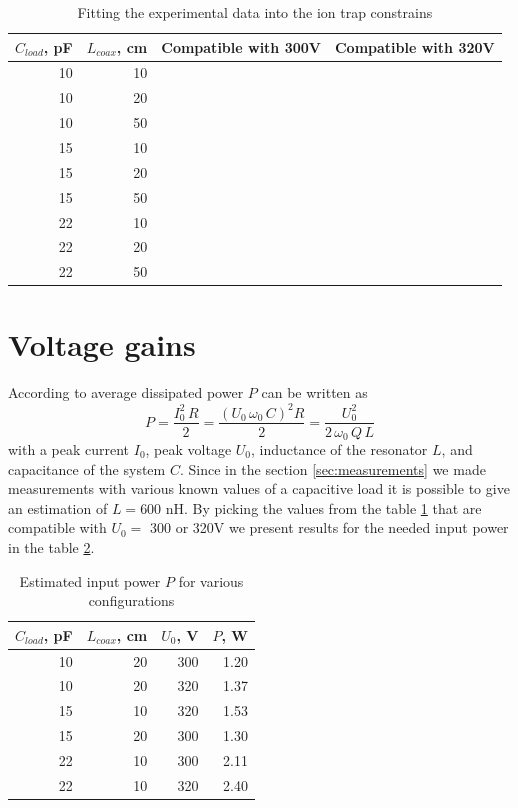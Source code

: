 \begin{table}[h]
\centering
\begin{tabular}{| r | r | c | c |}
	\hline
	$C_{load}$, pF & $L_{coax}$, cm & Compatible with 300V & Compatible with 320V\\
	\hline \hline
	10 & 10 & \xmark & \xmark\\
	\hline
	10 & 20 & \cmark & \cmark\\
	\hline
	10 & 50 & \xmark & \xmark\\
	\hline
	15 & 10 & \xmark & \cmark\\
	\hline
	15 & 20 & \cmark & \xmark\\
	\hline
	15 & 50 & \xmark & \xmark\\
	\hline
	22 & 10 & \cmark & \cmark\\
	\hline
	22 & 20 & \xmark & \xmark\\
	\hline
	22 & 50 & \xmark & \xmark\\
	\hline
\end{tabular}
\label{tbl:ideal_drive}
\caption{Fitting the experimental data into the ion trap constrains}
\end{table}

\section{Voltage gains}
According to \cite{Leupold2015} average dissipated power $P$ can be written as
\begin{equation}
	P = \frac{I_0^2 \, R}{2} = \frac{\left(U_0 \, \omega_0 \, C\right)^2 R}{2} = \frac{U_0^2}{2 \, \omega_0 \, Q  \, L}
\end{equation}
with a peak current $I_0$, peak voltage $U_0$, inductance of the resonator $L$, and capacitance of the system $C$. Since in the section \ref{sec:measurements} we made measurements with various known values of a capacitive load it is possible to give an estimation of $L = 600$ nH. By picking the values from the table \ref{tbl:ideal_drive} that are compatible with $U_0 = $ 300 or 320V we present results for the needed input power in the table \ref{tbl:input_power}.

\begin{table}[h]
\centering
\begin{tabular}{| r | r | r | r |}
	\hline
	$C_{load}$, pF & $L_{coax}$, cm & $U_0$, V & $P$, W\\
	\hline \hline
	10 & 20 & 300 & 1.20\\
	\hline
	10 & 20 & 320 & 1.37\\
	\hline
	15 & 10 & 320 & 1.53\\
	\hline
	15 & 20 & 300 & 1.30\\
	\hline
	22 & 10 & 300 & 2.11\\
	\hline
	22 & 10 & 320 & 2.40\\
	\hline
\end{tabular}
\label{tbl:input_power}
\caption{Estimated input power $P$ for various configurations}
\end{table}